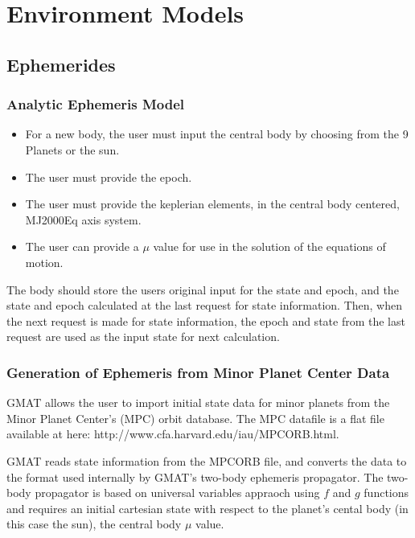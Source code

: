 \section{Environment Models}


\subsection{Ephemerides}

\subsubsection{Analytic Ephemeris Model}

\begin{itemize}
     \item For a new body, the user must input the central body by
     choosing from the 9 Planets or the sun.
     \item The user must provide the epoch.
     \item  The user must provide the keplerian elements, in the
     central body centered, MJ2000Eq axis system.
     \item  The user can provide a $\mu$ value for use in the
     solution of the equations of motion.
\end{itemize}

The body should store the users original input for the state and
epoch, and the state and epoch calculated at the last request for
state information. Then, when the next request is made for state
information, the epoch and state from the last request are used as
the input state for next calculation.

\subsubsection{Generation of Ephemeris from Minor Planet Center
 Data}

GMAT allows the user to import initial state data for minor planets
from the Minor Planet Center's (MPC) orbit database.  The MPC
datafile is a flat file available at here:
http://www.cfa.harvard.edu/iau/MPCORB.html.

GMAT reads state information from the MPCORB file, and converts the
data to the format used internally by GMAT's two-body ephemeris
propagator.  The two-body propagator is based on universal variables
appraoch using $f$ and $g$ functions and requires an initial
cartesian state with respect to the planet's cental body (in this
case the sun), the central body $\mu$ value.

